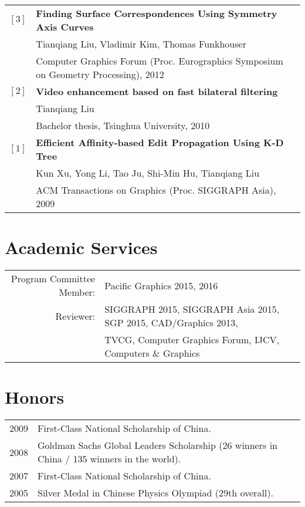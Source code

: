 \documentclass[letterpaper,10pt]{article}
\begin{document}
\begin{tabular}{ll}
$[3]$ & \textbf{Finding Surface Correspondences Using Symmetry Axis Curves}\\
    & Tianqiang Liu, Vladimir Kim, Thomas Funkhouser\\
    & Computer Graphics Forum (Proc. Eurographics Symposium on Geometry Processing), 2012  \vspace{0.06in}\\
$[2]$ & \textbf{Video enhancement based on fast bilateral filtering}\\
    & Tianqiang Liu \\
    & Bachelor thesis, Tsinghua University, 2010 \vspace{0.06in}\\
$[1]$ & \textbf{Efficient Affinity-based Edit Propagation Using K-D Tree}\\
    & Kun Xu, Yong Li, Tao Ju, Shi-Min Hu, Tianqiang Liu\\
    & ACM Transactions on Graphics (Proc. SIGGRAPH Asia), 2009 \vspace{0.06in}\\
\end{tabular}


\section{Academic Services}
\begin{tabular}{rl}
Program Committee Member: & Pacific Graphics 2015, 2016\\
Reviewer: & SIGGRAPH 2015, SIGGRAPH Asia 2015, SGP 2015, CAD/Graphics 2013,\\
          & TVCG, Computer Graphics Forum, IJCV, Computers \& Graphics 
\end{tabular}

\section{Honors}
\begin{tabular}{rl}
2009 & First-Class National Scholarship of China. \\
2008 & Goldman Sachs Global Leaders Scholarship (26 winners in China / 135 winners in the world). \\
2007 & First-Class National Scholarship of China. \\
2005 & Silver Medal in Chinese Physics Olympiad (29th overall).
\end{tabular}
\end{document}
